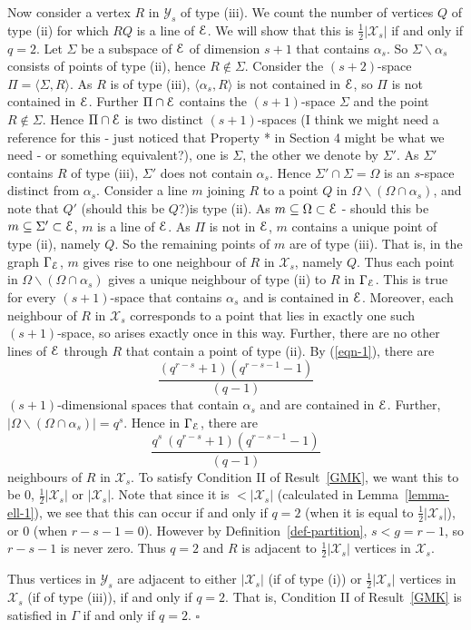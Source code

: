 \documentclass[12pt]{article}
\newenvironment{proof}{\noindent{\bf Proof}\hspace{0.5em}}
    { \null  \hfill $\square$ \par}
\newcommand{\X}{\mathcal X}
\newcommand{\Y}{\mathcal Y}
\newcommand\E{{\cal E}}
\renewcommand\setminus{\backslash}
\newcommand\TODO[1]{{\color{Purple} #1}}
\begin{document}
\begin{proof}
{ Now consider a vertex $R$ in $\Y_s$ of type (iii).} We count the number of vertices $Q$ of type (ii) for which $RQ$ is a line of $\E$. We will show that this is $\frac12|\X_s|$ if and only if $q=2$. Let $\Sigma$ be a subspace of $\E$ of dimension $s+1$ that contains $\alpha_s$. So $\Sigma\setminus\alpha_s$ consists of points of type (ii), hence $R\notin\Sigma$. Consider the $(s+2)$-space $\Pi=\langle \Sigma,R\rangle$. As $R$ is of type (iii), $\langle\alpha_s,R\rangle$ is not contained in $\E$, so $\Pi$ is not contained in $\E$. Further $\Pi\cap\E$ contains the $(s+1)$-space $\Sigma$ and the point $R\notin\Sigma$. 
Hence $\Pi\cap\E$ is two distinct $(s+1)$-spaces \TODO{(I think we might need a reference for this - just noticed that Property * in Section 4 might be what we need - or something equivalent?)}, one is $\Sigma$, the other we denote by $\Sigma'$.  As $\Sigma'$ contains $R$ of type (iii),  $\Sigma'$ does not contain $\alpha_s$. Hence $\Sigma'\cap\Sigma=\Omega$ is an $s$-space distinct from $\alpha_s$. Consider a line $m$ joining $R$ to a point $Q$ in $\Omega\setminus(\Omega\cap\alpha_s)$, and note that  $Q'$ \TODO{(should this be $Q$?)}is type (ii). As  $m\subseteq\Omega\subset\E$ - \TODO{should this be $m\subseteq\Sigma'\subset\E$}, $m$ is a line of $\E$. As $\Pi$ is not in $\E$, $m$  contains a unique point of type (ii), namely $Q$. So the remaining points of $m$ are of type (iii). That is, in the graph $\Gamma_\E$, $m$ gives rise to one neighbour of $R$ in $\X_s$, namely $Q$.
Thus each point in $\Omega\setminus(\Omega\cap\alpha_s)$ gives a unique neighbour  of type (ii) to $R$  in $\Gamma_\E$. This is true for every $(s+1)$-space that contains $\alpha_s$ and is contained in $\E$. Moreover, each neighbour  of $R$ in $\X_s$ corresponds to a point that lies in exactly one such $(s+1)$-space, so arises   exactly once in this way. Further, there are no other  lines of $\E$ through $R$ that contain a point of type (ii). By (\ref{eqn-1}), there are 
$$\frac{ (q^{r-s}+1)(q^{r-s-1}-1)}{(q-1)}$$ $(s+1)$-dimensional spaces that contain $\alpha_s$ and are contained in $\E$. Further, $|\Omega\setminus(\Omega\cap\alpha_s)|=q^{s}$. Hence in $\Gamma_\E$, there are 
\[
\frac{ q^{s}\ (q^{r-s}+1)(q^{r-s-1}-1)}{(q-1)}
\] neighbours of $R$ in $\X_s$. 
To satisfy Condition II of Result~\ref{GMK}, we  want this to be 0, $\frac12|\X_s|$ or $|\X_s|$. Note that since it is $<|\X_s|$ (calculated in Lemma~\ref{lemma-ell-1}), we see that this can occur if and only if $q=2$ \TODO{(when it is equal to $\frac12|\X_s|$), or 0 (when $r-s-1=0$). However by Definition~\ref{def-partition}, $s<g=r-1$, so $r-s-1$ is never zero.  Thus $q=2$ and } $R$ is adjacent to $\frac12|\X_s|$ vertices in $\X_s$.
 
 Thus vertices in $\Y_s$ are adjacent to  either $|\X_s|$ \TODO{(if of type (i))} or $\frac12|\X_s|$ vertices in $\X_s$ \TODO{(if of type (iii))}, if and only if $q=2$. That is, Condition II of Result~\ref{GMK} is satisfied in $\Gamma$ if and only if $q=2$.  
\end{proof}
\end{document}
